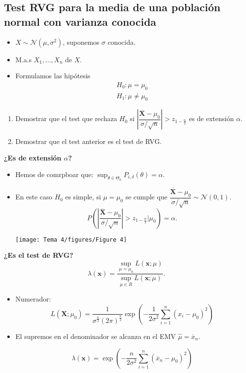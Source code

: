 \subsection{Test RVG para la media de una población normal con varianza conocida}
\begin{tcolorbox}[colback=blue!5!white, colframe=blue!75!black, title=\textbf{Ejercicio}]
\begin{itemize}[label=\textbullet]
    \item $X\sim \mathcal{N}(\mu,\sigma^2)$, suponemos $\sigma$ conocida.
    \item M.a.s  $X_1,\dots,X_n$ de $X$.
    \item Formulamos las hipótesis  \[
            \begin{array}{l}
    H_0:\mu=\mu_0\\
    H_1:\mu\neq \mu_0
            \end{array}
    \] 
\end{itemize}
\begin{enumerate}[label=\arabic*)]
    \item Demostrar que el test que rechaza $H_0$ si $\left| \dfrac{\mathbf{\overline{X}}-\mu_0}{\sigma / \sqrt{n} } \right| >z_{1-\frac{\alpha}{2} }$ es de extensión $\alpha$.
    \item Demostrar que el test anterior es el test de RVG.
\end{enumerate}
\end{tcolorbox}
\textbf{¿Es de extensión $\alpha$?} 
\begin{itemize}[label=\textbullet]
    \item Hemos de comrpboar que: $\sup_{\theta\in \Theta_0}P_{i,\delta}(\theta)=\alpha$.
    \item En este caso $H_0$ es simple, si $\mu=\mu_0$ se cumple que $\dfrac{\mathbf{\overline{X}}-\mu_0}{\sigma / \sqrt{n} }\sim \mathcal{N}(0,1)$. \[
    P\left( \left| \dfrac{\mathbf{\overline{X}}-\mu_0}{\sigma / \sqrt{n} } \right|>z_{1-\frac{\alpha}{2} }|\mu_0  \right) =\alpha.
    \] 
    \begin{center}
        \texttt{[image: Tema 4/figures/Figure 4]}
    \end{center}
\end{itemize}
\textbf{¿Es el test de RVG?}
\[
\lambda(\mathbf{x})=\dfrac{\displaystyle \sup_{\mu=\mu_0}L(\mathbf{x};\mu)}{\displaystyle \sup_{\mu\in R}L(\mathbf{x};\mu)}.
\] 
\begin{itemize}[label=\textbullet]
    \item Numerador: \[
    L(\mathbf{X};\mu_0)=\dfrac{1}{\sigma^{\frac{n}{2} }(2\pi)^{\frac{n}{2} }}\exp\left( -\dfrac{1}{2\sigma^2}\sum_{i=1}^{n} (x_i-\mu_0)^2 \right) 
    \] 
\item El supremos en el denominador se alcanza en el EMV $\hat{\mu}=\overline{x}_n$.

    \[
        \lambda(\mathbf{x})=\exp\left( -\dfrac{n}{2\sigma^2}\sum_{i=1}^{n} (\overline{x}_n-\mu_0)^2 \right)
    \] 
\end{itemize}
